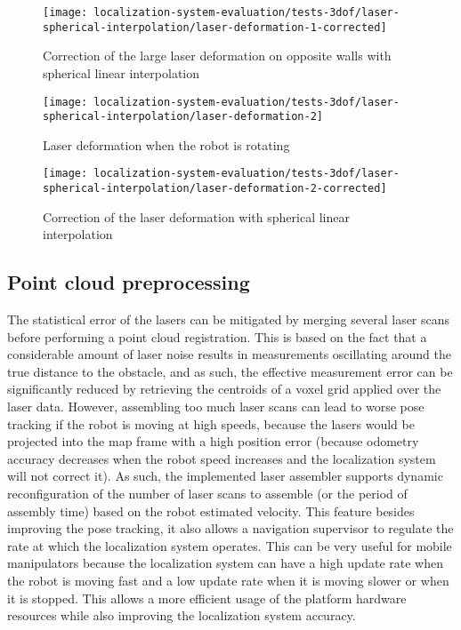 \begin{figure}[ht]
	\centering
	\texttt{[image: localization-system-evaluation/tests-3dof/laser-spherical-interpolation/laser-deformation-1-corrected]}
	\caption{Correction of the large laser deformation on opposite walls with spherical linear interpolation}
	\label{fig:localization-system-evaluation_laser-deformation-1-corrected}
\end{figure}


\begin{figure}[ht]
	\centering
	\texttt{[image: localization-system-evaluation/tests-3dof/laser-spherical-interpolation/laser-deformation-2]}
	\caption{Laser deformation when the robot is rotating}
	\label{fig:localization-system-evaluation_laser-deformation-2}
\end{figure}

\begin{figure}[ht]
	\centering
	\texttt{[image: localization-system-evaluation/tests-3dof/laser-spherical-interpolation/laser-deformation-2-corrected]}
	\caption{Correction of the laser deformation with spherical linear interpolation}
	\label{fig:localization-system-evaluation_laser-deformation-2-corrected}
\end{figure}



\subsection{Point cloud preprocessing}

The statistical error of the lasers can be mitigated by merging several laser scans before performing a point cloud registration. This is based on the fact that a considerable amount of laser noise results in measurements oscillating around the true distance to the obstacle, and as such, the effective measurement error can be significantly reduced by retrieving the centroids of a voxel grid applied over the laser data. However, assembling too much laser scans can lead to worse pose tracking if the robot is moving at high speeds, because the lasers would be projected into the map frame with a high position error (because odometry accuracy decreases when the robot speed increases and the localization system will not correct it). As such, the implemented laser assembler supports dynamic reconfiguration of the number of laser scans to assemble (or the period of assembly time) based on the robot estimated velocity. This feature besides improving the pose tracking, it also allows a navigation supervisor to regulate the rate at which the localization system operates. This can be very useful for mobile manipulators because the localization system can have a high update rate when the robot is moving fast and a low update rate when it is moving slower or when it is stopped. This allows a more efficient usage of the platform hardware resources while also improving the localization system accuracy.

